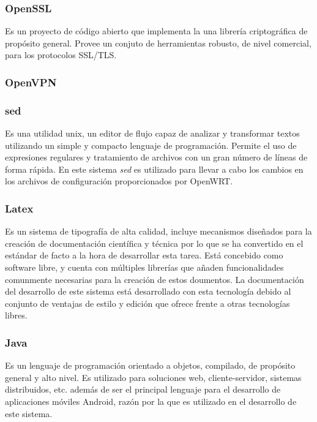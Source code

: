 \documentclass[12pt]{article}
\begin{document}
            \subsubsection{OpenSSL}
                Es un proyecto de código abierto que implementa la una librería criptográfica de propósito general. Provee un conjuto de herramientas robusto, de nivel comercial, para los protocolos SSL/TLS.

        \subsubsection{OpenVPN}

        \subsubsection{sed}
            Es una utilidad unix, un editor de flujo capaz de analizar y transformar textos utilizando un simple y compacto lenguaje de programación. Permite el uso de expresiones regulares y tratamiento de archivos con un gran número de líneas de forma rápida. En este sistema \textit{sed} es utilizado para llevar a cabo los cambios en los archivos de configuración proporcionados por OpenWRT.

        \subsubsection{Latex}
            Es un sistema de tipografía de alta calidad, incluye mecanismos diseñados para la creación de documentación científica y técnica por lo que se ha convertido en el estándar de facto a la hora de desarrollar esta tarea. Está concebido como software libre, y cuenta con múltiples librerías que añaden funcionalidades comunmente necesarias para la creación de estos doumentos. La documentación del desarrollo de este sistema está desarrollado con esta tecnología debido al conjunto de ventajas de estilo y edición que ofrece frente a otras tecnologías libres.

        \subsubsection{Java}
            Es un lenguaje de programación orientado a objetos, compilado, de propósito general y alto nivel. Es utilizado para soluciones web, cliente-servidor, sistemas distribuidos, etc. además de ser el principal lenguaje para el desarrollo de aplicaciones móviles Android, razón por la que es utilizado en el desarrollo de este sistema.
\end{document}
